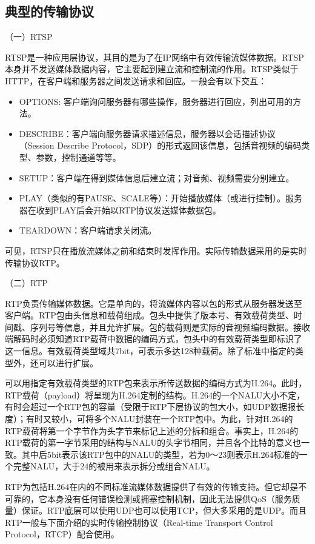 \subsection{典型的传输协议}
\label{subsec:protocols}

（一）RTSP

RTSP是一种应用层协议，其目的是为了在IP网络中有效传输流媒体数据。RTSP本身并不发送媒体数据内容，它主要起到建立流和控制流的作用。RTSP类似于HTTP，在客户端和服务器之间发送请求和回应。一般会有以下交互：
\begin{itemize}
\item OPTIONS: 客户端询问服务器有哪些操作，服务器进行回应，列出可用的方法。
\item DESCRIBE：客户端向服务器请求描述信息，服务器以会话描述协议（Session Describe Protocol，SDP）的形式返回该信息，包括音视频的编码类型、参数，控制通道等等。
\item SETUP：客户端在得到媒体信息后建立流；对音频、视频需要分别建立。
\item PLAY（类似的有PAUSE、SCALE等）：开始播放媒体（或进行控制）。服务器在收到PLAY后会开始以RTP协议发送媒体数据包。
\item TEARDOWN：客户端请求关闭流。
\end{itemize}

可见，RTSP只在播放流媒体之前和结束时发挥作用。实际传输数据采用的是实时传输协议RTP。

（二）RTP

RTP负责传输媒体数据。它是单向的，将流媒体内容以包的形式从服务器发送至客户端。RTP包由头信息和载荷组成\supercite{RTP}。包头中提供了版本号、有效载荷类型、时间戳、序列号等信息，并且允许扩展。包的载荷则是实际的音视频编码数据。接收端解码时必须知道RTP载荷中数据的编码方式，包头中的有效载荷类型即标识了这一信息。有效载荷类型域共7bit，可表示多达128种载荷。除了标准中指定的类型外，还可以进行扩展。

可以用指定有效载荷类型的RTP包来表示所传送数据的编码方式为H.264。此时，RTP载荷（payload）将呈现为H.264定制的结构\supercite{RTP-H.264}。H.264的一个NALU大小不定，有时会超过一个RTP包的容量（受限于RTP下层协议的包大小，如UDP数据报长度）；有时又较小，可将多个NALU封装在一个RTP包中。为此，针对H.264的RTP载荷将第一个字节作为头字节来标记上述的分拆和组合。事实上，H.264的RTP载荷的第一字节采用的结构与NALU的头字节相同，并且各个比特的意义也一致。其中后5bit表示该RTP包中的NALU的类型，若为0～23则表示H.264标准的一个完整NALU，大于24的被用来表示拆分或组合NALU。

RTP为包括H.264在内的不同标准流媒体数据提供了有效的传输支持。但它却是不可靠的，它本身没有任何错误检测或拥塞控制机制，因此无法提供QoS（服务质量）保证。RTP底层可以使用UDP也可以使用TCP，但大多采用的是UDP。而且RTP一般与下面介绍的实时传输控制协议（Real-time Transport Control Protocol，RTCP）配合使用。

